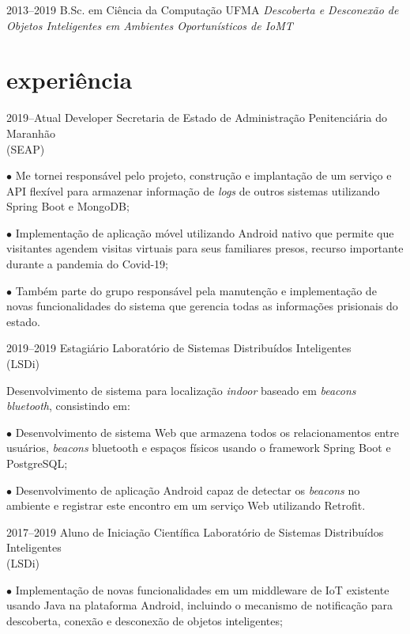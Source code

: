 \documentclass[]{../document-class/TwentySecondsCurriculumVitae-LaTex/twentysecondcv}
\begin{document}
\begin{twenty}
	\twentyitem
		{2013--2019}
		{B.Sc. em Ciência da Computação}
		{UFMA}
		{\emph{Descoberta e Desconexão de Objetos Inteligentes em Ambientes Oportunísticos de IoMT}}
\end{twenty}

\section{experiência}

\begin{twenty}
	\twentyitem
		{2019--Atual} %
		{Developer} %
		{Secretaria de Estado de Administração Penitenciária do Maranhão \\\hspace*{\fill}(SEAP)}
		{$\bullet$ Me tornei responsável pelo projeto, construção e implantação de um serviço e API flexível para armazenar informação de \textit{logs} de outros sistemas utilizando Spring Boot e MongoDB;\vskip 4pt

		$\bullet$ Implementação de aplicação móvel utilizando Android nativo que permite que visitantes agendem visitas virtuais para seus familiares presos, recurso importante durante a pandemia do Covid-19;\vskip 4pt

		$\bullet$ Também parte do grupo responsável pela manutenção e implementação de novas funcionalidades do sistema que gerencia todas as informações prisionais do estado.}
	
	\twentyitem
		{2019--2019}
		{Estagiário}
		{Laboratório de Sistemas Distribuídos Inteligentes \\\hspace*{\fill}(LSDi)}
		{Desenvolvimento de sistema para localização \textit{indoor} baseado em \textit{beacons bluetooth}, consistindo em:\vskip 4pt
          
			$\bullet$ Desenvolvimento de sistema Web que armazena todos os relacionamentos entre usuários, \textit{beacons} bluetooth e espaços físicos usando o framework Spring Boot e PostgreSQL;\vskip 4pt
        
			$\bullet$ Desenvolvimento de aplicação Android capaz de detectar os \textit{beacons} no ambiente e registrar este encontro em um serviço Web utilizando Retrofit.}
			
	\twentyitem
		{2017--2019} %
		{Aluno de Iniciação Científica} %
		{Laboratório de Sistemas Distribuídos Inteligentes \\\hspace*{\fill}(LSDi)}
		{$\bullet$ Implementação de novas funcionalidades em um middleware de IoT existente usando Java na plataforma Android, incluindo o mecanismo de notificação para descoberta, conexão e desconexão de objetos inteligentes;\vskip 4pt 

}
\end{twenty}
\end{document}
